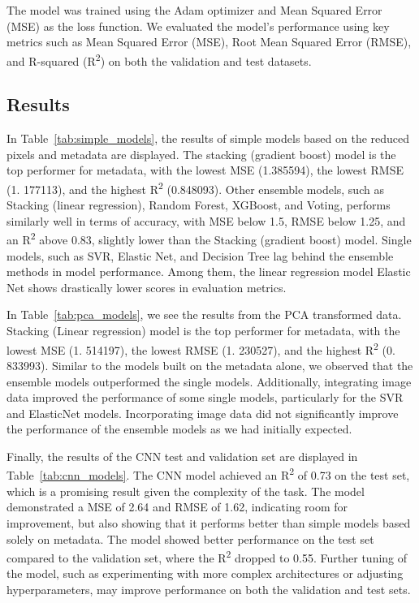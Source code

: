 The model was trained using the Adam optimizer and Mean Squared Error (MSE) as the loss function.
We evaluated the model's performance using key metrics such as Mean Squared Error (MSE), Root Mean Squared Error (RMSE), and R-squared (R\textsuperscript{2}) on both the validation and test datasets.

\subsection{Results}

In Table~\ref{tab:simple_models}, the results of simple models based on the reduced pixels and metadata are displayed.
The stacking (gradient boost) model is the top performer for metadata, with the lowest MSE (1.385594), the lowest RMSE (1. 177113), and the highest R\textsuperscript{2} (0.848093).
Other ensemble models, such as Stacking (linear regression), Random Forest, XGBoost, and Voting, performs similarly well in terms of accuracy, with MSE below 1.5, RMSE below 1.25, and an R\textsuperscript{2} above 0.83, slightly lower than the Stacking (gradient boost) model.
Single models, such as SVR, Elastic Net, and Decision Tree lag behind the ensemble methods in model performance.
Among them, the linear regression model Elastic Net shows drastically lower scores in evaluation metrics.

In Table~\ref{tab:pca_models}, we see the results from the PCA transformed data.
Stacking (Linear regression) model is the top performer for metadata, with the lowest MSE (1. 514197), the lowest RMSE (1. 230527), and the highest R\textsuperscript{2} (0. 833993).
Similar to the models built on the metadata alone, we observed that the ensemble models outperformed the single models.
Additionally, integrating image data improved the performance of some single models, particularly for the SVR and ElasticNet models.
Incorporating image data did not significantly improve the performance of the ensemble models as we had initially expected.

Finally, the results of the CNN test and validation set are displayed in Table~\ref{tab:cnn_models}.
The CNN model achieved an R\textsuperscript{2} of 0.73 on the test set, which is a promising result given the complexity of the task.
The model demonstrated a MSE of 2.64 and RMSE of 1.62, indicating room for improvement, but also showing that it performs better than simple models based solely on metadata.
The model showed better performance on the test set compared to the validation set, where the R\textsuperscript{2} dropped to 0.55.
Further tuning of the model, such as experimenting with more complex architectures or adjusting hyperparameters, may improve performance on both the validation and test sets.


